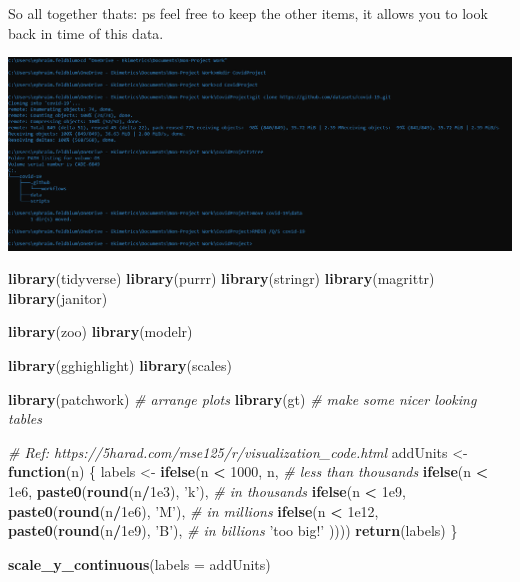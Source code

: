 \documentclass[
]{article}
\newenvironment{Shaded}{\begin{snugshade}}{\end{snugshade}}
\newcommand{\CommentTok}[1]{\textcolor[rgb]{0.56,0.35,0.01}{\textit{#1}}}
\newcommand{\ControlFlowTok}[1]{\textcolor[rgb]{0.13,0.29,0.53}{\textbf{#1}}}
\newcommand{\DataTypeTok}[1]{\textcolor[rgb]{0.13,0.29,0.53}{#1}}
\newcommand{\DecValTok}[1]{\textcolor[rgb]{0.00,0.00,0.81}{#1}}
\newcommand{\FloatTok}[1]{\textcolor[rgb]{0.00,0.00,0.81}{#1}}
\newcommand{\KeywordTok}[1]{\textcolor[rgb]{0.13,0.29,0.53}{\textbf{#1}}}
\newcommand{\NormalTok}[1]{#1}
\newcommand{\OperatorTok}[1]{\textcolor[rgb]{0.81,0.36,0.00}{\textbf{#1}}}
\newcommand{\StringTok}[1]{\textcolor[rgb]{0.31,0.60,0.02}{#1}}
\begin{document}
So all together thats: ps feel free to keep the other items, it allows
you to look back in time of this data.

\includegraphics{3.png}

\begin{Shaded}
\begin{Highlighting}[]
\KeywordTok{library}\NormalTok{(tidyverse)}
\KeywordTok{library}\NormalTok{(purrr)}
\KeywordTok{library}\NormalTok{(stringr)}
\KeywordTok{library}\NormalTok{(magrittr)}
\KeywordTok{library}\NormalTok{(janitor)}

\KeywordTok{library}\NormalTok{(zoo)}
\KeywordTok{library}\NormalTok{(modelr)}

\KeywordTok{library}\NormalTok{(gghighlight)}
\KeywordTok{library}\NormalTok{(scales)}

\KeywordTok{library}\NormalTok{(patchwork) }\CommentTok{# arrange plots}
\KeywordTok{library}\NormalTok{(gt) }\CommentTok{# make some nicer looking tables}


\CommentTok{# Ref: https://5harad.com/mse125/r/visualization_code.html}
\NormalTok{addUnits <-}\StringTok{ }\ControlFlowTok{function}\NormalTok{(n) \{}
\NormalTok{  labels <-}\StringTok{ }\KeywordTok{ifelse}\NormalTok{(n }\OperatorTok{<}\StringTok{ }\DecValTok{1000}\NormalTok{, n,  }\CommentTok{# less than thousands}
                   \KeywordTok{ifelse}\NormalTok{(n }\OperatorTok{<}\StringTok{ }\FloatTok{1e6}\NormalTok{, }\KeywordTok{paste0}\NormalTok{(}\KeywordTok{round}\NormalTok{(n}\OperatorTok{/}\FloatTok{1e3}\NormalTok{), }\StringTok{'k'}\NormalTok{),  }\CommentTok{# in thousands}
                          \KeywordTok{ifelse}\NormalTok{(n }\OperatorTok{<}\StringTok{ }\FloatTok{1e9}\NormalTok{, }\KeywordTok{paste0}\NormalTok{(}\KeywordTok{round}\NormalTok{(n}\OperatorTok{/}\FloatTok{1e6}\NormalTok{), }\StringTok{'M'}\NormalTok{),  }\CommentTok{# in millions}
                                 \KeywordTok{ifelse}\NormalTok{(n }\OperatorTok{<}\StringTok{ }\FloatTok{1e12}\NormalTok{, }\KeywordTok{paste0}\NormalTok{(}\KeywordTok{round}\NormalTok{(n}\OperatorTok{/}\FloatTok{1e9}\NormalTok{), }\StringTok{'B'}\NormalTok{), }\CommentTok{# in billions}
                                        \StringTok{'too big!'}
\NormalTok{                                 ))))}
  \KeywordTok{return}\NormalTok{(labels)}
\NormalTok{\}}

 \KeywordTok{scale_y_continuous}\NormalTok{(}\DataTypeTok{labels =}\NormalTok{ addUnits) }
\end{Highlighting}
\end{Shaded}
\end{document}
